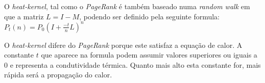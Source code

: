 \documentclass[a4paper,10pt]{article}
\begin{document}
    O  \textit{heat-kernel}, tal como o \textit{PageRank} é também baseado numa \textit{random walk} em que a matriz $L=I-M$, podendo ser definido pela seguinte formula:\\
    $P_t(n)=P_0(I+\frac{-t}{n}L)^n$
    
    O \textit{heat-kernel} difere do \textit{PageRank} porque este satisfaz a equação de calor. A constante $t$ que aparece na formula podem assumir valores superiores ou iguais a 0 e representa a condutividade térmica. Quanto mais alto esta constante for, mais rápida será a propagação do calor.  
    
  
\end{document}
